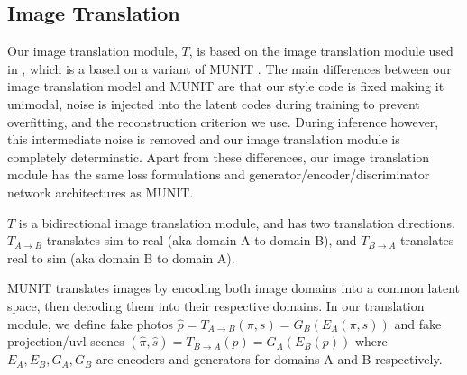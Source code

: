\documentclass{article}
\begin{document}
\subsection{Image Translation}

\newcommand{\Tab}{T_{A\rightarrow B}}
\newcommand{\Tba}{T_{B\rightarrow A}}
\newcommand{\pih}{\hat{\pi}}
\newcommand{\sh}{\hat{s}}
\newcommand{\ph}{\hat{p}}
\newcommand{\pis}{\pi,s} %
\newcommand{\pish}{\pih,\sh} %
\newcommand{\ppis}{(\pis)} %
\newcommand{\ppish}{(\pish)} %





Our image translation module, $T$, is based on the image translation module used in \citep{surgical_video_translation}, which is a based on a variant \cite{surgical_image_translation} of MUNIT \cite{munit}. The main differences between our image translation model and MUNIT are that our style code is fixed making it unimodal, noise is injected into the latent codes during training to prevent overfitting, and the reconstruction criterion we use. During inference however, this intermediate noise is removed and our image translation module is completely determinstic. Apart from these differences, our image translation module has the same loss formulations and generator/encoder/discriminator network architectures as MUNIT. 

$T$ is a bidirectional image translation module, and has two translation directions. $\Tab$ translates sim to real (aka domain A to domain B), and $\Tba$ translates real to sim (aka domain B to domain A).

MUNIT translates images by encoding both image domains into a common latent space, then decoding them into their respective domains.
In our translation module, we define fake photos $\ph = \Tab(\pis) = G_B(E_A(\pis))$ and fake projection/uvl scenes $\ppish = \Tba(p) = G_A(E_B(p))$
	where $E_A, E_B, G_A, G_B$ are encoders and generators for domains A and B respectively.
\end{document}
